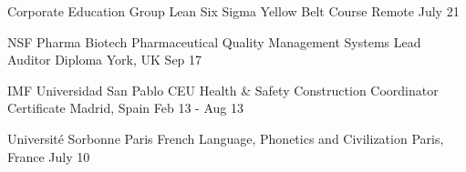 

\begin{cventries}

\cventry
    {Corporate Education Group} %
    {Lean Six Sigma Yellow Belt Course} %
    {Remote} %
    {July 21} %
    {}

\cventry
    {NSF Pharma Biotech} %
    {Pharmaceutical Quality Management Systems Lead Auditor Diploma} %
    {York, UK} %
    {Sep 17} %
    {}

\cventry
    {IMF Universidad San Pablo CEU} %
    {Health \& Safety Construction Coordinator Certificate} %
    {Madrid, Spain} %
    {Feb 13 - Aug 13} %
    {}

\cventry
    {Université Sorbonne Paris} %
    {French Language, Phonetics and Civilization} %
    {Paris, France} %
    {July 10} %
    {}

\end{cventries}

